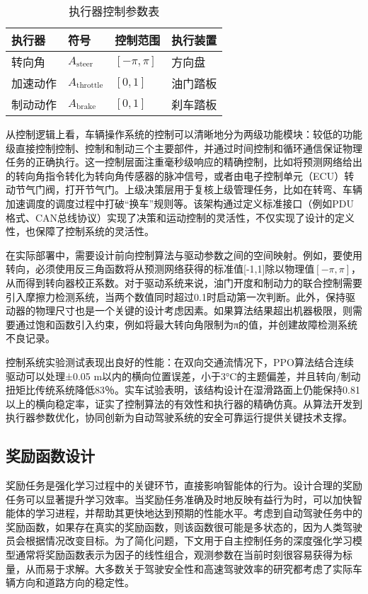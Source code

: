 \begin{table}[htbp]
	\centering
	\caption{执行器控制参数表}
	\label{tab:actuators}
	\begin{tabular}{llll}
		\toprule
		\textbf{执行器} & \textbf{符号} & \textbf{控制范围} & \textbf{执行装置} \\
		\midrule
		转向角   & \( A_{\text{steer}} \)   & \(\left[-\pi, \pi\right]\)  & 方向盘 \\
		加速动作 & \( A_{\text{throttle}} \) & \([0, 1]\)                & 油门踏板 \\
		制动动作 & \( A_{\text{brake}} \)    & \([0, 1]\)                & 刹车踏板 \\
		\bottomrule
	\end{tabular}
\end{table}


从控制逻辑上看，车辆操作系统的控制可以清晰地分为两级功能模块：较低的功能级直接控制控制、控制和制动三个主要部件，并通过时间控制和循环通信保证物理任务的正确执行。这一控制层面注重毫秒级响应的精确控制，比如将预测网络给出的转向角指令转化为转向角传感器的脉冲信号，或者由电子控制单元（ECU）转动节气门阀，打开节气门。上级决策层用于复核上级管理任务，比如在转弯、车辆加速调度的调度过程中打破“换车”规则等。该架构通过定义标准接口（例如PDU格式、CAN总线协议）实现了决策和运动控制的灵活性，不仅实现了设计的定义性，也保障了控制系统的灵活性。

在实际部署中，需要设计前向控制算法与驱动参数之间的空间映射。例如，要使用转向，必须使用反三角函数将从预测网络获得的标准值[-1,1]除以物理值\([-π,π]\)，从而得到转向器校正系数。对于驱动系统来说，油门开度和制动力的联合控制需要引入摩擦力检测系统，当两个数值同时超过0.1时启动第一次判断。此外，保持驱动器的物理尺寸也是一个关键的设计考虑因素。如果算法结果超出机器极限，则需要通过饱和函数引入约束，例如将最大转向角限制为π的值，并创建故障检测系统不良记录。

控制系统实验测试表现出良好的性能：在双向交通流情况下，PPO算法结合连续驱动可以处理±0.05 m以内的横向位置误差，小于3°C的主题偏差，并且转向/制动扭矩比传统系统降低83％。实车试验表明，该结构设计在湿滑路面上仍能保持0.81以上的横向稳定率，证实了控制算法的有效性和执行器的精确仿真。从算法开发到执行器参数优化，协同创新为自动驾驶系统的安全可靠运行提供关键技术支撑。

\subsection{奖励函数设计}

奖励任务是强化学习过程中的关键环节，直接影响智能体的行为。设计合理的奖励任务可以显著提升学习效率。当奖励任务准确及时地反映有益行为时，可以加快智能体的学习进程，并帮助其更快地达到预期的性能水平。考虑到自动驾驶任务中的奖励函数，如果存在真实的奖励函数，则该函数很可能是多状态的，因为人类驾驶员会根据情况改变目标。为了简化问题，下文用于自主控制任务的深度强化学习模型通常将奖励函数表示为因子的线性组合，观测参数在当前时刻很容易获得为标量，从而易于求解。大多数关于驾驶安全性和高速驾驶效率的研究都考虑了实际车辆方向和道路方向的稳定性。

